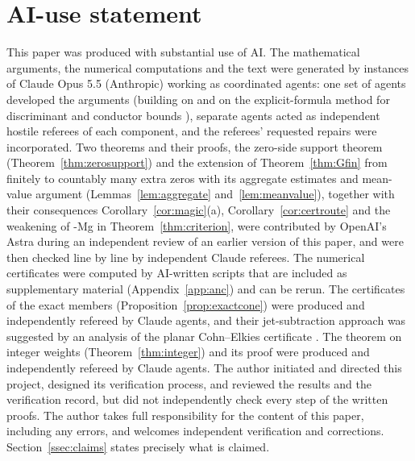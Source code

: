 \documentclass[11pt]{amsart}
\theoremstyle{definition}
\theoremstyle{remark}
\numberwithin{equation}{section}
\newcommand{\inputsection}[1]{}
\begin{document}
\section*{AI-use statement}
This paper was produced with substantial use of AI. The mathematical arguments, the numerical computations and the text were
generated by instances of Claude Opus 5.5 (Anthropic) working as coordinated agents: one set of agents developed the arguments
(building on \cite{BRS} and on the explicit-formula method for discriminant and conductor bounds \cite{Sta74,Odl76,Ser75,Poi77,Poi77b}), separate agents
acted as independent hostile referees of each component, and the referees' requested repairs were incorporated. Two theorems and their
proofs, the zero-side support theorem (Theorem~\ref{thm:zerosupport}) and the extension of Theorem~\ref{thm:Gfin} from finitely to countably
many extra zeros with its aggregate estimates and mean-value argument (Lemmas~\ref{lem:aggregate} and~\ref{lem:meanvalue}), together with
their consequences Corollary~\ref{cor:magic}(a), Corollary~\ref{cor:certroute} and the weakening of \hyp{Mg} in Theorem~\ref{thm:criterion},
were contributed by OpenAI's Astra during an independent review of an earlier version of this paper, and were then checked line by line by
independent Claude referees. The numerical
certificates were computed by AI-written scripts that are included as supplementary material (Appendix~\ref{app:anc}) and can be
rerun. The certificates of the exact members (Proposition~\ref{prop:exactcone}) were produced and independently refereed by
Claude agents, and their jet-subtraction approach was suggested by an analysis of the planar Cohn--Elkies certificate \cite{OAI26planar}. The
theorem on integer weights (Theorem~\ref{thm:integer}) and its proof were produced and independently refereed by Claude agents. The author initiated and directed this project, designed its verification process, and reviewed the results and the
verification record, but did not independently check every step of the written proofs. The author takes full responsibility for the
content of this paper, including any errors, and welcomes independent verification and corrections. Section~\ref{ssec:claims}
states precisely what is claimed.

\appendix
\inputsection{A-certification}
\inputsection{B-proofs}
\inputsection{C-anc}



\end{document}
